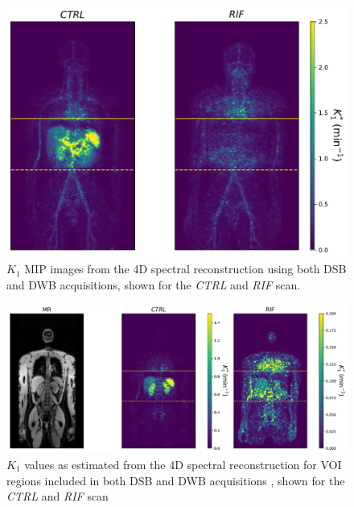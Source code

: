 \begin{figure} [h!]
\centering
\includegraphics[scale=0.5,angle=0]{3_Results/3_3_DWB_Reconstruction/figures/3_3_IsotoPK_K1_MIPs.pdf}
\caption{$K_1$ MIP images from the 4D spectral reconstruction using both DSB and DWB acquisitions, shown for the \textit{CTRL} and \textit{RIF} scan.}
\label{fig_3_3:IsotoPK_K1_MIP}
\end{figure} 

\begin{figure} [h!]
\centering
\includegraphics[scale=0.5,angle=0]{3_Results/3_3_DWB_Reconstruction/figures/3_3_IsotoPK_K1_SingleSlice.pdf}
\caption{$K_1$ values as estimated from the 4D spectral reconstruction for VOI regions included in both DSB and DWB acquisitions , shown for the \textit{CTRL} and \textit{RIF} scan}
\label{fig_3_3:IsotoPK_K1_SingleSlice}
\end{figure} 

